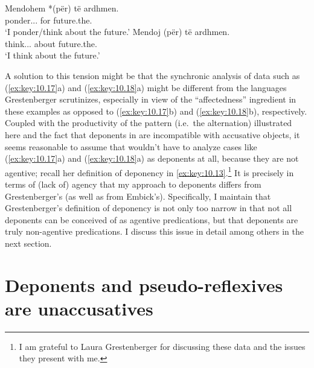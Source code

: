 \documentclass[output=paper]{langsci/langscibook}
\begin{document}
\ea\label{ex:key:10.18} 
    \ea
    \gll    Mendohem *(për) {të ardhmen}.\\
            ponder.\Fsg.\Prs.\Nact{} \hphantom{*(}for    future.the.\Acc{}\\
    \glt    ‘I ponder/think about the future.’
    \ex
    \gll    Mendoj (për) {të ardhmen}.\\
            think.\Fsg.\Prs.\Act{}  \hphantom{(}about future.the.\Acc{}\\
    \glt    ‘I think about the future.’
    \z
\z

A solution to this tension might be that the synchronic analysis of data such
as (\ref{ex:key:10.17}a) and (\ref{ex:key:10.18}a) might be different from the
languages Grestenberger scrutinizes, especially in view of the
\enquote{affectedness} ingredient in these examples as opposed to
(\ref{ex:key:10.17}b) and (\ref{ex:key:10.18}b), respectively. Coupled with the
productivity of the pattern (i.e.\ the alternation) illustrated here and the
fact that deponents in  are incompatible with accusative objects, it
seems reasonable to assume that \citet{Grestenberger2018a} wouldn’t have to
analyze cases like (\ref{ex:key:10.17}a) and (\ref{ex:key:10.18}a) as deponents
at all, because they are not agentive; recall her definition of deponency in
\eqref{ex:key:10.13}.\footnote{I am grateful to Laura Grestenberger for
discussing these data and the issues they present with me.} It is precisely in
terms of (lack of) agency that my approach to deponents differs from
Grestenberger’s (as well as from Embick’s). Specifically, I maintain that
Grestenberger’s definition of deponency is not only too narrow in that not all
deponents can be conceived of as agentive predications, but that deponents are
truly non-agentive predications. I discuss this issue in detail among others in
the next section.

\section{Deponents and pseudo-reflexives are unaccusatives}\label{sec:key:10.4}
\end{document}
